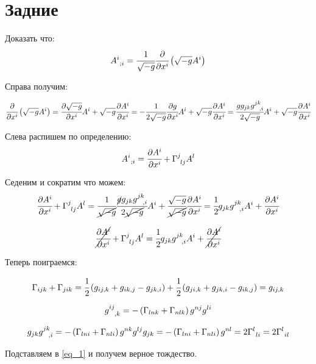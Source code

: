 \section{Задние}

Доказать что:
\begin{equation}
    A^i_{\ ;i} = \cfrac{1}{\sqrt{-g}} \cfrac{\partial }{\partial x^i}\left( \sqrt{-g} A^i \right)
\end{equation}

Справа получим:

\begin{equation}
    \cfrac{\partial }{\partial x^i}\left( \sqrt{-g} A^i \right) = 
    \cfrac{\partial \sqrt{-g}}{\partial x^i}A^i + \sqrt{-g}\cfrac{\partial A^i}{\partial x^i} = 
    -\cfrac{1}{2\sqrt{-g}} \cfrac{\partial g}{\partial x^i}A^i + \sqrt{-g}\cfrac{\partial A^i}{\partial x^i} =
    \cfrac{gg_{jk}g^{jk}_{\ \ ,i}}{2\sqrt{-g}} A^i + \sqrt{-g}\cfrac{\partial A^i}{\partial x^i}
\end{equation}

Слева распишем по определению:
\begin{equation}
    A^i_{\ ;i} = \piv{A^i}{x^i} + \Gamma^j_{\ lj} A^{l} 
\end{equation}


Седеним и сократим что можем:
\begin{equation}
    \piv{A^i}{x^i} + \Gamma^j_{\ lj} A^{l} = 
    \cfrac{1}{\cancel{\sqrt{-g}}} \cfrac{\cancel{g}g_{jk}g^{jk}_{\ \ ,i}}{2\cancel{\sqrt{-g}}} A^i 
    + \cfrac{\sqrt{-g}}{\cancel{\sqrt{-g}}} \piv{A^i}{x^i}
    =\cfrac{1}{2} g_{jk}g^{jk}_{\ \ ,i} A^i + \piv{A^i}{x^i}
\end{equation}

\begin{equation}
    \label{eq_1}
    \cancel{\cfrac{\partial A^i}{\partial x^i}} + \Gamma^j_{\ lj} A^{l} = 
    \cfrac{1}{2} g_{jk}g^{jk}_{\ \ ,i} A^i + \cancel{\cfrac{\partial A^i}{\partial x^i}}
\end{equation}

Теперь поиграемся:

\begin{equation}
    \Gamma_{ijk} + \Gamma_{jik} = \cfrac{1}{2} \left( g_{ij,k} + g_{ik,j} - g_{jk,i} \right) + \cfrac{1}{2} \left( g_{ji,k} + g_{jk,i} - g_{ik,j} \right) = g_{ij,k}
\end{equation}

\begin{equation}
    g^{ij}_{\ \ ,k} = -\left( \Gamma_{lnk} + \Gamma_{nlk} \right) g^{nj} g^{li}
\end{equation}

\begin{equation}
    \label{eq_2}
    g_{jk}g^{jk}_{\ \ ,i} = -\left( \Gamma_{lni} + \Gamma_{nli} \right) g^{nk} g^{lj }g_{jk} = -\left( \Gamma_{lni} + \Gamma_{nli} \right) g^{nl} = 2 \Gamma^l_{\ li} = 2 \Gamma^l_{\ il}
\end{equation}

Подставляем в \ref{eq_1} и получем верное тождество.


